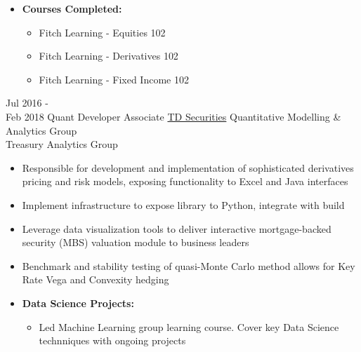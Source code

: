 \documentclass[letterpaper]{twentysecondcv} %
\begin{document}
\begin{twenty}
{\begin{itemize}
\begin{itemize}
					\item Trade Surveillance - NLP entity mapping to flag trader conversations
				\end{itemize}
				\item \textbf{Courses Completed:}
				\begin{itemize}
					\item Fitch Learning - Equities 102
					\item Fitch Learning - Derivatives 102
					\item Fitch Learning - Fixed Income 102
				\end{itemize}
			\end{itemize}
		}	
		
	\twentyitem
    	{Jul 2016 - \\ Feb 2018}
        {Quant Developer Associate}
        {\href{https://www.tdsecurities.com}{TD Securities}}
        {Quantitative Modelling \& Analytics Group \\
        Treasury Analytics Group}
        {
        \item{}
        \item{}
        \item
        \item{}
        \item{}
        \item{}
        \item{}
		\item{}
		\item{}
		}
        {\begin{itemize}
        \item Responsible for development and implementation of sophisticated derivatives pricing and risk models, exposing functionality to Excel and Java interfaces
        \item Implement infrastructure to expose library to Python, integrate with build
        \item Leverage data visualization tools to deliver interactive mortgage-backed security (MBS) valuation module to business leaders
        \item Benchmark and stability testing of quasi-Monte Carlo method allows for Key Rate Vega and Convexity hedging   
		\item \textbf{Data Science Projects:}
		\begin{itemize}
        	\item Led Machine Learning group learning course. Cover key Data Science technniques with ongoing projects

\end{itemize}
\end{itemize}}
\end{twenty}
\end{document}
